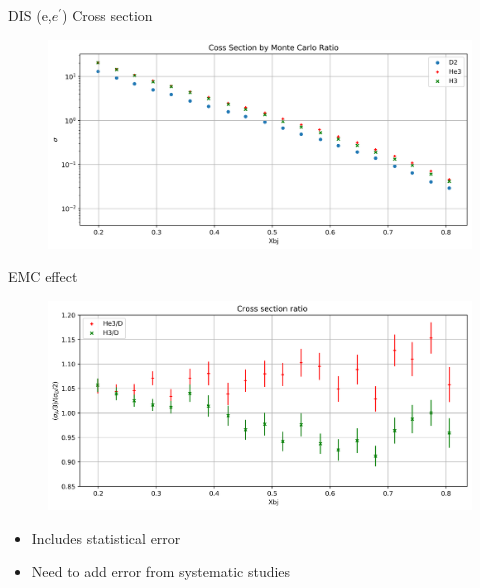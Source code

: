 \documentclass{beamer}
\begin{document}
\begin{frame}
	\begin{block}{DIS (e,$e^\prime$) Cross section}
	\begin{figure}
			\includegraphics[width=12.0cm]{../images/all_final}
	\end{figure}

	\end{block}

\end{frame}

\begin{frame}
\begin{block}{EMC effect}
	\begin{figure}
		\includegraphics[width=12.0cm]{../images/EMC_final}
	\end{figure}
	\vspace{-20pt}
	\begin{itemize}
		\item Includes statistical error 
		\item Need to add error from systematic studies
		
	\end{itemize}

\end{block}

\end{frame}
\end{document}

